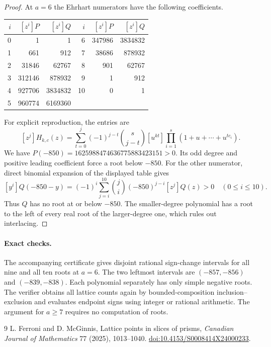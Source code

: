 \documentclass[11pt]{article}
\newcommand{\bin}[2]{\binom{#1}{#2}}
\begin{document}
\begin{proof}
At $a=6$ the Ehrhart numerators have the following coefficients.
\begin{center}\small
\begin{tabular}{r|r|r@{\qquad}r|r|r}
$i$&$[z^i]P$&$[z^i]Q$&$i$&$[z^i]P$&$[z^i]Q$\\\hline
0&1&1&6&347986&3834832\\
1&661&912&7&38686&878932\\
2&31846&62767&8&901&62767\\
3&312146&878932&9&1&912\\
4&927706&3834832&10&0&1\\
5&960774&6169360&&&\end{tabular}
\end{center}
For explicit reproduction, the entries are
\[
 [z^j]H_{k,c}(z)=\sum_{t=0}^j(-1)^{j-t}\bin{s}{j-t}
       [u^{kt}]\prod_{i=1}^s(1+u+\cdots+u^{tc_i}).
\]
We have $P(-850)=1625988474636775883423151>0$. Its odd degree and
positive leading coefficient force a root below $-850$. For the other
numerator, direct binomial expansion of the displayed table gives
\[
 [y^i]Q(-850-y)=(-1)^i\sum_{j=i}^{10}\bin ji(-850)^{j-i}[z^j]Q(z)>0
 \quad(0\le i\le10).
\]
Thus $Q$ has no root at or below $-850$. The smaller-degree polynomial
has a root to the left of every real root of the larger-degree one,
which rules out interlacing.
\end{proof}

\paragraph{Exact checks.}
The accompanying certificate gives disjoint rational sign-change intervals
for all nine and all ten roots at $a=6$. The two leftmost intervals are
$(-857,-856)$ and $(-839,-838)$. Each polynomial separately has only
simple negative roots. The verifier obtains all lattice counts again by
bounded-composition inclusion--exclusion and evaluates endpoint signs
using integer or rational arithmetic. The argument for $a\ge7$ requires
no computation of roots.

\begin{thebibliography}{9}
 L. Ferroni and D. McGinnis, Lattice points in slices of prisms,
\emph{Canadian Journal of Mathematics} 77 (2025), 1013--1040.
\href{https://doi.org/10.4153/S0008414X24000233}{doi:10.4153/S0008414X24000233}.
\end{thebibliography}
\end{document}
